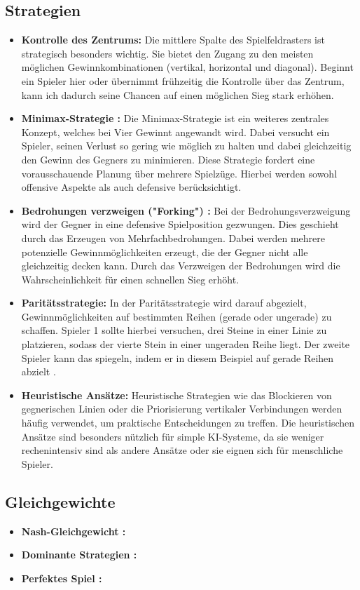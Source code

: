 \subsection{Strategien}
\begin{itemize}
	\item \textbf{Kontrolle des Zentrums:}
	Die mittlere Spalte des Spielfeldrasters ist strategisch besonders wichtig. Sie bietet den Zugang zu den meisten möglichen Gewinnkombinationen (vertikal, horizontal und diagonal). Beginnt ein Spieler hier oder übernimmt frühzeitig die Kontrolle über das Zentrum, kann ich dadurch seine Chancen auf einen möglichen Sieg stark erhöhen\autocite{cornell2015connect}.
	\item \textbf{Minimax-Strategie :} Die Minimax-Strategie ist ein weiteres zentrales Konzept, welches bei Vier Gewinnt angewandt wird. Dabei versucht ein Spieler, seinen Verlust so gering wie möglich zu halten und dabei gleichzeitig den Gewinn des Gegners zu minimieren. Diese Strategie fordert eine vorausschauende Planung über mehrere Spielzüge. Hierbei werden sowohl offensive Aspekte als auch defensive berücksichtigt\autocite{cornell2015connect}.
	
	\item \textbf{Bedrohungen verzweigen ("Forking") :} Bei der Bedrohungsverzweigung wird der Gegner in eine defensive Spielposition gezwungen. Dies geschieht durch das Erzeugen von Mehrfachbedrohungen. Dabei werden mehrere potenzielle Gewinnmöglichkeiten erzeugt, die der Gegner nicht alle gleichzeitig decken kann. Durch das Verzweigen der Bedrohungen wird die Wahrscheinlichkeit für einen schnellen Sieg erhöht\autocite{Cahn2024}.
	
	\item \textbf{ Paritätsstrategie:} In der Paritätsstrategie wird darauf abgezielt, Gewinnmöglichkeiten auf bestimmten Reihen (gerade oder ungerade) zu schaffen. Spieler 1 sollte hierbei versuchen, drei Steine in einer Linie zu platzieren, sodass der vierte Stein in einer ungeraden Reihe liegt. Der zweite Spieler kann das spiegeln, indem er in diesem Beispiel auf gerade Reihen abzielt \autocite{cornell2015connect}.
	
	\newpage
	\item \textbf{ Heuristische Ansätze:} Heuristische Strategien wie das Blockieren von gegnerischen Linien oder die Priorisierung vertikaler Verbindungen werden häufig verwendet, um praktische Entscheidungen zu treffen. Die heuristischen Ansätze sind besonders nützlich für simple KI-Systeme, da sie weniger rechenintensiv sind als andere Ansätze oder sie eignen sich für menschliche Spieler.  
	
	
\end{itemize}

\subsection{Gleichgewichte}
\begin{itemize}
	\item \textbf{Nash-Gleichgewicht :}
	\item \textbf{Dominante Strategien :}
	\item \textbf{Perfektes Spiel :}

\end{itemize}
